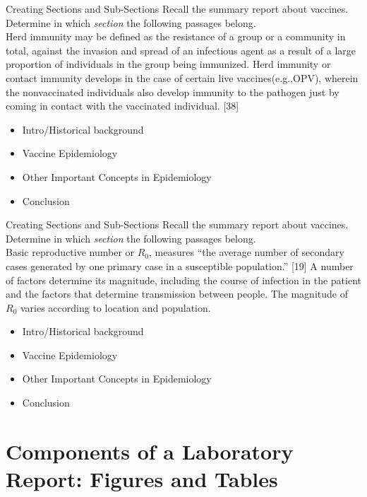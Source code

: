 \documentclass{beamer}
\begin{document}
\begin{frame}{Creating Sections and Sub-Sections}
Recall the summary report about vaccines.  Determine in which \textit{section} the following passages belong. \\ \vspace{0.25cm}
Herd immunity may be defined as the resistance of a group or a community in total, against the invasion and spread of an infectious agent as a result of a large proportion of individuals in the group being immunized. Herd immunity or contact immunity develops in the case of certain live vaccines(e.g.,OPV), wherein the nonvaccinated individuals also develop immunity to the pathogen just by coming in contact with the vaccinated individual. [38]
\begin{itemize}
\item Intro/Historical background
\item Vaccine Epidemiology
\item Other Important Concepts in Epidemiology
\item Conclusion
\end{itemize}
\end{frame}

\begin{frame}{Creating Sections and Sub-Sections}
Recall the summary report about vaccines.  Determine in which \textit{section} the following passages belong. \\ \vspace{0.25cm}
Basic reproductive number or $R_0$, measures ``the average number of secondary cases generated by one primary case in a susceptible population.'' [19] A number of factors determine its magnitude, including the course of infection in the patient and the factors that determine transmission between people. The magnitude of $R_0$ varies according to location and population.
\begin{itemize}
\item Intro/Historical background
\item Vaccine Epidemiology
\item Other Important Concepts in Epidemiology
\item Conclusion
\end{itemize}
\end{frame}

\section{Components of a Laboratory Report: Figures and Tables}
\end{document}
